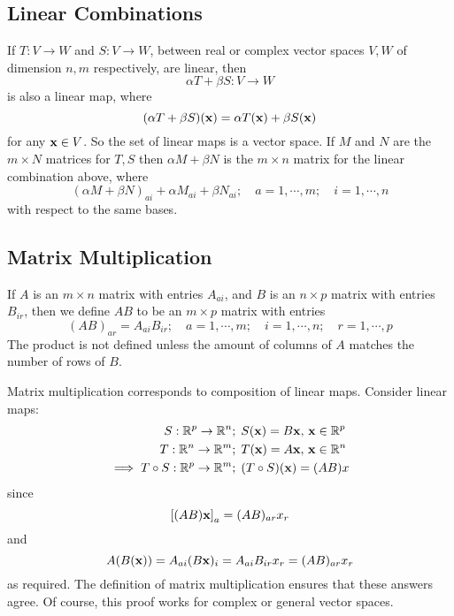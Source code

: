 \subsection{Linear Combinations}
If \(T: V \to W\) and \(S: V \to W\), between real or complex vector spaces \(V, W\) of dimension \(n, m\) respectively, are linear, then
\[ \alpha T + \beta S: V \to W \]
is also a linear map, where
\[ (\alpha T + \beta S)(\vb x) = \alpha T(\vb x) + \beta S(\vb x) \]
for any \(\vb x \in V\). So the set of linear maps is a vector space. If \(M\) and \(N\) are the \(m\times N\) matrices for \(T, S\) then \(\alpha M + \beta N\) is the \(m\times n\) matrix for the linear combination above, where
\[ (\alpha M + \beta N)_{ai} + \alpha M_{ai} + \beta N_{ai};\quad a = 1, \cdots, m;\quad i = 1, \cdots, n \]
with respect to the same bases.

\subsection{Matrix Multiplication}
If \(A\) is an \(m\times n\) matrix with entries \(A_{ai}\), and \(B\) is an \(n \times p\) matrix with entries \(B_{ir}\), then we define \(AB\) to be an \(m \times p\) matrix with entries
\[ (AB)_{ar} = A_{ai}B_{ir};\quad a = 1, \cdots, m;\quad i = 1, \cdots, n;\quad r = 1, \cdots, p \]
The product is not defined unless the amount of columns of \(A\) matches the number of rows of \(B\).

Matrix multiplication corresponds to composition of linear maps. Consider linear maps:
\begin{align*}
	S: \mathbb R^p \to \mathbb R^n                  & ;\; S(\vb x) = B \vb x,\, \vb x \in \mathbb R^p \\
	T: \mathbb R^n \to \mathbb R^m                  & ;\; T(\vb x) = A \vb x,\, \vb x \in \mathbb R^n \\
	\implies T \circ S: \mathbb R^p \to \mathbb R^m & ;\; (T\circ S)(\vb x) = (AB)x
\end{align*}
since
\[ \left[ (AB)\vb x \right]_a = (AB)_{ar}x_r \]
and
\[ A(B(\vb x)) = A_{ai} (B\vb x)_i = A_{ai} B_{ir} x_r = (AB)_{ar}x_r \]
as required. The definition of matrix multiplication ensures that these answers agree. Of course, this proof works for complex or general vector spaces.

